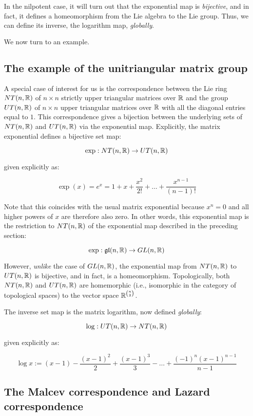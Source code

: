 In the nilpotent case, it will turn out that the exponential map is
{\em bijective}, and in fact, it defines a homeomorphism from the Lie
algebra to the Lie group. Thus, we can define its inverse, the
logarithm map, {\em globally}.

We now turn to an example.

\subsection{The example of the unitriangular matrix group}\label{sec:unitriangular-lie-correspondence}

A special case of interest for us is the correspondence between the
Lie ring $NT(n,\mathbb{R})$ of $n \times n$ strictly upper triangular matrices
over $\mathbb{R}$ and the group $UT(n,\mathbb{R})$ of $n \times n$ upper triangular
matrices over $\mathbb{R}$ with all the diagonal entries equal to $1$. This
correspondence gives a bijection between the underlying sets of
$NT(n,\mathbb{R})$ and $UT(n,\mathbb{R})$ via the exponential map. Explicitly, the
matrix exponential defines a bijective set map:

$$\exp: NT(n,\mathbb{R}) \to UT(n,\mathbb{R})$$

given explicitly as:

$$\exp(x) = e^x = 1 + x + \frac{x^2}{2!} + \dots + \frac{x^{n-1}}{(n - 1)!}$$

Note that this coincides with the usual matrix exponential because
$x^n = 0$ and all higher powers of $x$ are therefore also zero. In
other words, this exponential map is the restriction to $NT(n,\mathbb{R})$ of
the exponential map described in the preceding section:

$$\exp: \mathfrak{g}\mathfrak{l}(n,\mathbb{R}) \to GL(n,\mathbb{R})$$

However, {\em unlike} the case of $GL(n,\mathbb{R})$, the exponential map from
$NT(n,\mathbb{R})$ to $UT(n,\mathbb{R})$ is bijective, and in fact, is a
homeomorphism. Topologically, both $NT(n,\mathbb{R})$ and $UT(n,\mathbb{R})$ are
homemorphic (i.e., isomorphic in the category of topological spaces) to
the vector space $\mathbb{R}^{\binom{n}{2}}$.

The inverse set map is the matrix logarithm, now defined {\em
  globally}:

$$\log: UT(n,\mathbb{R}) \to NT(n,\mathbb{R})$$

given explicitly as:

$$\log x := (x - 1) - \frac{(x - 1)^2}{2} + \frac{(x - 1)^3}{3} - \dots + \frac{(-1)^n (x - 1)^{n-1}}{n - 1}$$

\subsection{The Malcev correspondence and Lazard correspondence}\label{sec:intro-malcev-and-lazard}

